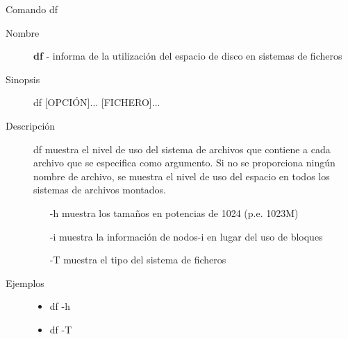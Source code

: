 \begin{frame}[c]{Comando df}
  \begin{description}
    \item[Nombre]
      \textbf{df} - informa de la utilización del espacio de disco en
      sistemas de ficheros

    \vspace{\baselineskip}
    \item[Sinopsis]
      df [OPCIÓN]... [FICHERO]...
      
    \vspace{\baselineskip}
    \item[Descripción]
      df muestra el nivel de uso del sistema de archivos que contiene a cada
      archivo que se especifica como argumento. Si no se proporciona ningún
      nombre de archivo, se muestra el nivel de uso del espacio en todos los
      sistemas de archivos montados.

      \begin{itemize}
        \item [-h] muestra los tamaños en potencias de 1024 (p.e. 1023M)
        \item [-i] muestra la información de nodos-i en lugar del uso de
          bloques
        \item [-T] muestra el tipo del sistema de ficheros
      \end{itemize}

    \vspace{\baselineskip}
    \item[Ejemplos]
      \begin{itemize}
        \item df -h
        \item df -T
      \end{itemize}
  \end{description}
\end{frame}

